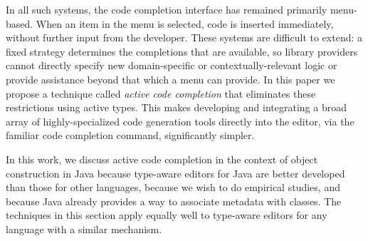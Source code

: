 
In all such systems, the code completion interface has remained primarily menu-based. When an item in the menu is selected, code is inserted immediately, without further input from the developer. These systems are difficult to extend: a fixed strategy determines the completions that are available, so library providers cannot directly specify new domain-specific or contextually-relevant logic or provide assistance beyond that which a menu can provide. 
In this paper we propose a technique called {\it active code completion} that eliminates these restrictions using active types. This  makes developing and integrating a broad array of highly-specialized code generation tools directly into the editor, via the familiar code completion command, significantly simpler.%

In this work, we discuss active code completion in the context of object construction in Java because type-aware editors for Java are better developed than those for other languages, because we wish to do empirical studies, and because Java already provides a way to associate metadata with classes. The techniques in this section apply equally well to type-aware editors for any language with a similar mechanism. 

